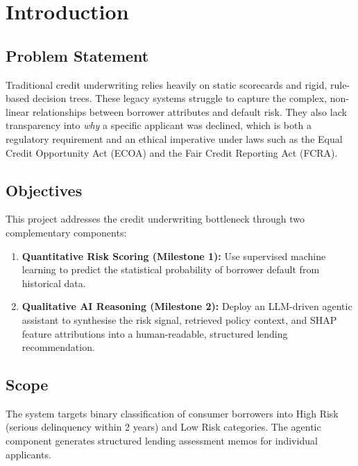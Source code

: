 \documentclass[11pt,a4paper]{article}
\begin{document}
\tableofcontents
\clearpage

\section{Introduction}
\label{sec:intro}

\subsection{Problem Statement}

Traditional credit underwriting relies heavily on static scorecards and rigid, rule-based
decision trees. These legacy systems struggle to capture the complex, non-linear
relationships between borrower attributes and default risk. They also lack transparency
into \emph{why} a specific applicant was declined, which is both a regulatory requirement
and an ethical imperative under laws such as the Equal Credit Opportunity Act (ECOA)
and the Fair Credit Reporting Act (FCRA).

\subsection{Objectives}

This project addresses the credit underwriting bottleneck through two complementary
components:
\begin{enumerate}
    \item \textbf{Quantitative Risk Scoring (Milestone 1):} Use supervised machine learning
          to predict the statistical probability of borrower default from historical data.
    \item \textbf{Qualitative AI Reasoning (Milestone 2):} Deploy an LLM-driven agentic
          assistant to synthesise the risk signal, retrieved policy context, and SHAP
          feature attributions into a human-readable, structured lending recommendation.
\end{enumerate}

\subsection{Scope}

The system targets binary classification of consumer borrowers into High Risk (serious
delinquency within 2 years) and Low Risk categories. The agentic component generates
structured lending assessment memos for individual applicants.
\end{document}
